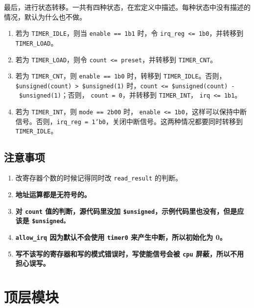 \documentclass[12pt,AutoFakeBold,AutoFakeSlant]{article}
\providecommand{\tightlist}{%
  \setlength{\itemsep}{0pt}\setlength{\parskip}{0pt}}
\newcommand{\ms}[1]{\texttt{#1}}
\begin{document}
最后，进行状态转移。一共有四种状态，在宏定义中描述。每种状态中没有描述的情况，默认为什么也不做。

\begin{enumerate}
\def\labelenumi{\arabic{enumi}.}
\tightlist
\item
  若为 \texttt{TIMER\_IDLE}，则当
  \texttt{enable\ ==\ 1\textquotesingle{}b1} 时，令
  \texttt{irq\_reg\ \textless{}=\ 1\textquotesingle{}b0}，并转移到
  \texttt{TIMER\_LOAD}。
\item
  若为 \texttt{TIMER\_LOAD}，则令 \texttt{count\ \textless{}=\ preset}，并转移到 \texttt{TIMER\_CNT}。
\item
  若为 \texttt{TIMER\_CNT}，则 \texttt{enable\ ==\ 1\textquotesingle{}b0} 时，转移到 \texttt{TIMER\_IDLE}。否则，\texttt{\$unsigned(count)\ \textgreater{}\ \$unsigned(1)}
  时，\texttt{count\ \textless{}=\ \$unsigned(count)\ -\ \$unsigned(1)}；否则， \ms{count = 0}，并转移到 \texttt{TIMER\_INT}， \texttt{irq\ \textless{}=\ 1\textquotesingle{}b1}。 
\item
  若为 \texttt{TIMER\_INT}，则 \texttt{mode\ ==\ 2\textquotesingle{}b00}
  时，
  \texttt{enable\ \textless{}=\ 1\textquotesingle{}b0}，这样可以保持中断信号。否则，\ms{irq\_reg = 1'b0}，关闭中断信号。这两种情况都要同时转移到 \ms{TIMER\_IDLE}。
\end{enumerate}

\hypertarget{ux6ce8ux610fux4e8bux9879-12}{%
\subsection{注意事项}\label{ux6ce8ux610fux4e8bux9879-12}}

\begin{enumerate}
\def\labelenumi{\arabic{enumi}.}
\tightlist
\item
  改寄存器个数的时候记得同时改 \texttt{read\_result} 的判断。
\item
  \textbf{地址运算都是无符号的。}
\item
  \textbf{对 \ms{count} 值的判断，源代码里没加 \ms{\$unsigned}，示例代码里也没有，但是应该是 \ms{\$unsigned。}}
\item
  \textbf{\texttt{allow\_irq} 因为默认不会使用 \ms{timer0} 来产生中断，所以初始化为 0。}
\item
  \textbf{写不该写的寄存器和写的模式错误时，写使能信号会被 \texttt{cpu} 屏蔽，所以不用担心误写。}
\end{enumerate}

\hypertarget{ux9876ux5c42ux6a21ux5757}{%
\section{顶层模块}\label{ux9876ux5c42ux6a21ux5757}}
\end{document}
